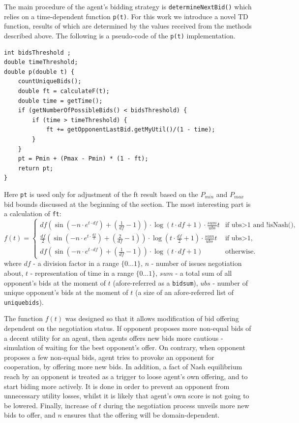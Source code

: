 \documentclass[html]{report}    %
\begin{document}
The main procedure of the agent's bidding strategy is \texttt{determineNextBid()} which relies on a time-dependent function \texttt{p(t)}. For this work we introduce a novel TD function, results of which are determined by the values received from the methods described above. The following is a pseudo-code of the \texttt{p(t)} implementation.
\begin{verbatim}
int bidsThreshold ;
double timeThreshold;
double p(double t) {
    countUniqueBids();
    double ft = calculateF(t);
    double time = getTime();
    if (getNumberOfPossibleBids() < bidsThreshold) {
        if (time > timeThreshold) {
            ft += getOpponentLastBid.getMyUtil()/(1 - time);
        }
    }
    pt = Pmin + (Pmax - Pmin) * (1 - ft);
    return pt;
}
\end{verbatim}
Here \texttt{pt} is used only for adjustment of the ft result based on the $P_{min}$ and $P_{max}$ bid bounds discussed at the beginning of the section. The most interesting part is a calculation of \texttt{ft}:
\begin{equation} \label{1}
	f(t) = \begin{cases}
			df(\sin(-n\cdot e^{t\cdot df})+(\frac{1}{df}-1))\cdot\log(t\cdot df+1)\cdot\frac{sum}{ubs}t &\text{if ubs$>$1 and !isNash(),}\\
			\frac{df}{2}(\sin(-n\cdot e^{t\cdot\frac{df}{2}})+(\frac{2}{df}-1))\cdot\log(t\cdot \frac{df}{2}+1)\cdot\frac{sum}{ubs}t &\text{if ubs$>$1,}\\
			df(\sin(-n\cdot e^{t\cdot df})+(\frac{1}{df}-1))\cdot\log(t\cdot df+1) &\text{otherwise.}
	\end{cases}
\end{equation}
where $df$ - a division factor in a range $\{0\dots1\}$, $n$ - number of issues negotiation about, $t$ - representation of time in a range $\{0\dots1\}$, $sum$ - a total sum of all opponent's bids at the moment of $t$ (afore-referred as a \texttt{bidsum}), $ubs$ - number of unique opponent's bids at the moment of $t$ (a size of an afore-referred list of \texttt{uniquebids}).

The function $f(t)$ was designed so that it allows modification of bid offering dependent on the negotiation status. If opponent proposes more non-equal bids of a decent utility for an agent, then agents offers new bids more cautious - simulation of waiting for the best opponent's offer. On contrary, when opponent proposes a few non-equal bids, agent tries to provoke an opponent for cooperation, by offering more new bids. In addition, a fact of Nash equilibrium reach by an opponent is treated as a trigger to loose agent's own offering, and to start biding more actively. It is done in order to prevent an opponent from unnecessary utility losses, whilst it is likely that agent's own score is not going to be lowered. Finally, increase of $t$ during the negotiation process unveils more new bids to offer, and $n$ ensures that the offering will be domain-dependent.
\end{document}
